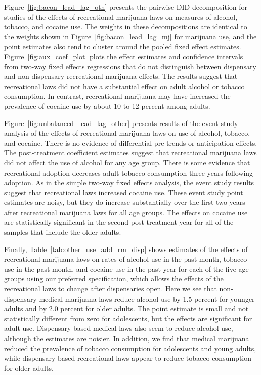 \documentclass[12pt]{article}%
\begin{document}
 Figure~\ref{fig:bacon_lead_lag_oth} presents the \cite{Goodman-Bacon2018} pairwise DID decomposition for studies of the effects of recreational marijuana laws on measures of alcohol, tobacco, and cocaine use. The weights in these decompositions are identical to the weights shown in Figure~\ref{fig:bacon_lead_lag_mj} for marijuana use, and the point estimates also tend to cluster around the pooled fixed effect estimates. Figure~\ref{fig:aux_coef_plot} plots the effect estimates and confidence intervals from two-way fixed effects regressions that do not distinguish between dispensary and non-dispensary recreational marijuana effects. The results suggest that recreational laws did not have a substantial effect on adult alcohol or tobacco consumption. In contrast, recreational marijuana may have increased the prevalence of cocaine use by about 10 to 12 percent among adults.

 Figure~\ref{fig:unbalanced_lead_lag_other} presents results of the event study analysis of the effects of recreational marijuana laws on use of alcohol, tobacco, and cocaine. There is no evidence of differential pre-trends or anticipation effects. The post-treatment coefficient estimates suggest that recreational marijuana laws did not affect the use of alcohol for any age group. There is some evidence that recreational adoption decreases adult tobacco consumption three years following adoption. As in the simple two-way fixed effects analysis, the event study results suggest that recreational laws increased cocaine use. These event study point estimates are noisy, but they do increase substantially over the first two years after recreational marijuana laws for all age groups. The effects on cocaine use are statistically significant in the second post-treatment year for all of the samples that include the older adults.   

Finally, Table~\ref{tab:other_use_add_rm_disp} shows estimates of the effects of recreational marijuana laws on rates of alcohol use in the past month, tobacco use in the past month, and cocaine use in the past year for each of the five age groups using our preferred specification, which allows the effects of the recreational laws to change after dispensaries open. Here we see that non-dispensary medical marijuana laws reduce alcohol use by 1.5 percent for younger adults and by 2.0 percent for older adults. The point estimate is small and not statistically different from zero for adolescents, but the effects are significant for adult use. Dispensary based medical laws also seem to reduce alcohol use, although the estimates are noisier. In addition, we find that medical marijuana reduced the prevalence of tobacco consumption for adolescents and young adults, while dispensary based recreational laws appear to reduce tobacco consumption for older adults. 
\end{document}

